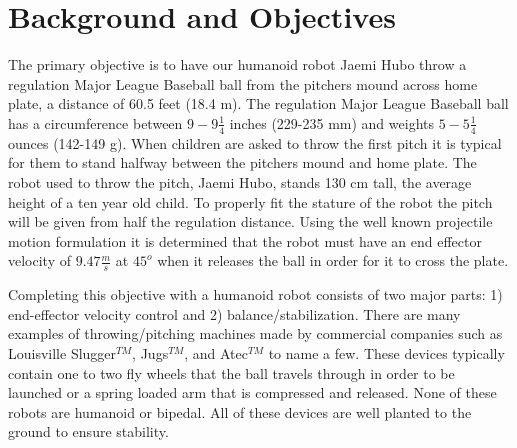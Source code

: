 \section{Background and Objectives}\label{sec:background}

The primary objective is to have our humanoid robot Jaemi Hubo throw a regulation Major League Baseball ball from the pitchers mound across home plate, a distance of 60.5 feet (18.4 m).  
The regulation Major League Baseball ball has a circumference between $9 - 9\frac{1}{4}$ inches (229-235 mm) and weights $5-5\frac{1}{4}$ ounces (142-149 g)\cite{mlbrules}.  
When children are asked to throw the first pitch it is typical for them to stand halfway between the pitchers mound and home plate.
The robot used to throw the pitch, Jaemi Hubo, stands 130 cm tall, the average height of a ten year old child.
To properly fit the stature of the robot the pitch will be given from half the regulation distance.
Using the well known projectile motion formulation it is determined that the robot must have an end effector velocity of $9.47\frac{m}{s}$ at $45^o$ when it releases the ball in order for it to cross the plate.





Completing this objective with a humanoid robot consists of two major parts: 1) end-effector velocity control and 2) balance/stabilization.
There are many examples of throwing/pitching machines made by commercial companies such as Louisville Slugger$^{TM}$, Jugs$^{TM}$, and Atec$^{TM}$ to name a few.  
These devices typically contain one to two fly wheels that the ball travels through in order to be launched or a spring loaded arm that is compressed and released.
None of these robots are humanoid or bipedal.
All of these devices are well planted to the ground to ensure stability.

